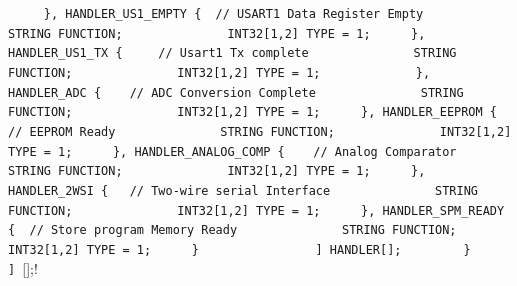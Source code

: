 {{{{\lstinline!	    }, HANDLER_US1_EMPTY {	// USART1 Data Register Empty! \newline
\lstinline!              STRING FUNCTION;! \newline
\lstinline!              INT32[1,2] TYPE = 1;! \newline
\lstinline!	    }, HANDLER_US1_TX {  	// Usart1 Tx complete! \newline
\lstinline!              STRING FUNCTION;! \newline
\lstinline!              INT32[1,2] TYPE = 1;! \newline
\lstinline!	      ! \newline
\lstinline!	    }, HANDLER_ADC { 	// ADC Conversion Complete! \newline
\lstinline!              STRING FUNCTION;! \newline
\lstinline!              INT32[1,2] TYPE = 1;! \newline
\lstinline!	    }, HANDLER_EEPROM {	// EEPROM Ready! \newline
\lstinline!              STRING FUNCTION;! \newline
\lstinline!              INT32[1,2] TYPE = 1;! \newline
\lstinline!	    }, HANDLER_ANALOG_COMP {	// Analog Comparator! \newline
\lstinline!              STRING FUNCTION;! \newline
\lstinline!              INT32[1,2] TYPE = 1;! \newline
\lstinline!	    }, HANDLER_2WSI {	// Two-wire serial Interface! \newline
\lstinline!              STRING FUNCTION;! \newline
\lstinline!              INT32[1,2] TYPE = 1;! \newline
\lstinline!	    }, HANDLER_SPM_READY {	// Store program Memory Ready! \newline
\lstinline!              STRING FUNCTION;! \newline
\lstinline!              INT32[1,2] TYPE = 1;! \newline
\lstinline!	    }! \newline
\lstinline!	    ! \newline
\lstinline!          ] HANDLER[];! \newline
\lstinline!        }! \newline
\lstinline!        ! \newline
\lstinline!      ] ![];! \newline
}}}}
